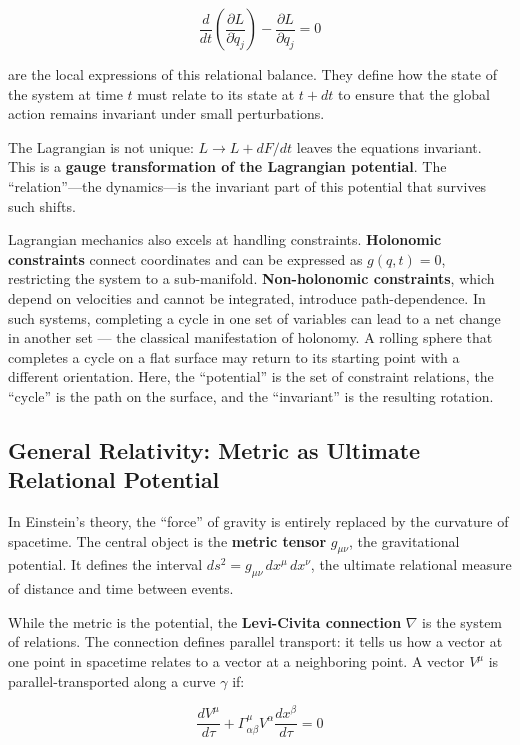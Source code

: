\begin{equation}
\frac{d}{dt}\left(\frac{\partial L}{\partial \dot{q}_j}\right) - \frac{\partial L}{\partial q_j} = 0
\end{equation}

are the local expressions of this relational balance. They define how the state of the system at time $t$ must relate to its state at $t+dt$ to ensure that the global action remains invariant under small perturbations.

The Lagrangian is not unique: $L \to L + dF/dt$ leaves the equations invariant. This is a \textbf{gauge transformation of the Lagrangian potential}. The ``relation''---the dynamics---is the invariant part of this potential that survives such shifts.

Lagrangian mechanics also excels at handling constraints. \textbf{Holonomic constraints} connect coordinates and can be expressed as $g(q, t) = 0$, restricting the system to a sub-manifold. \textbf{Non-holonomic constraints}, which depend on velocities and cannot be integrated, introduce path-dependence. In such systems, completing a cycle in one set of variables can lead to a net change in another set --- the classical manifestation of holonomy. A rolling sphere that completes a cycle on a flat surface may return to its starting point with a different orientation. Here, the ``potential'' is the set of constraint relations, the ``cycle'' is the path on the surface, and the ``invariant'' is the resulting rotation.

\subsection{General Relativity: Metric as Ultimate Relational Potential}\label{sec:gr}

In Einstein's theory, the ``force'' of gravity is entirely replaced by the curvature of spacetime. The central object is the \textbf{metric tensor} $g_{\mu\nu}$, the gravitational potential. It defines the interval $ds^2 = g_{\mu\nu}\, dx^\mu\, dx^\nu$, the ultimate relational measure of distance and time between events.

While the metric is the potential, the \textbf{Levi-Civita connection} $\nabla$ is the system of relations. The connection defines parallel transport: it tells us how a vector at one point in spacetime relates to a vector at a neighboring point. A vector $V^\mu$ is parallel-transported along a curve $\gamma$ if:

\begin{equation}
\frac{dV^\mu}{d\tau} + \Gamma^\mu_{\alpha\beta} V^\alpha \frac{dx^\beta}{d\tau} = 0
\end{equation}

